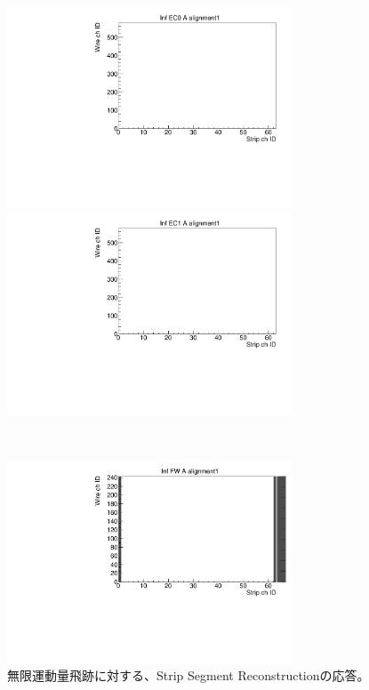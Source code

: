 \begin{figure}
  \begin{minipage}[b]{.5\linewidth}
      \centering
      \includegraphics[height=6cm]{fig/Test/B_InfEC0_strip.pdf}
  \end{minipage}
  \begin{minipage}[b]{.5\linewidth}
      \centering
      \includegraphics[height=6cm]{fig/Test/B_InfEC1_strip.pdf}
  \end{minipage}\\
  \begin{minipage}[b]{\linewidth}
      \centering
      \includegraphics[height=6cm]{fig/Test/B_InfFW_strip.pdf}
  \end{minipage}
  \caption[異なる画像形式の比較]{無限運動量飛跡に対する、Strip Segment Reconstructionの応答。}
  \label{Inf_B_Strip}
  \end{figure}
  
